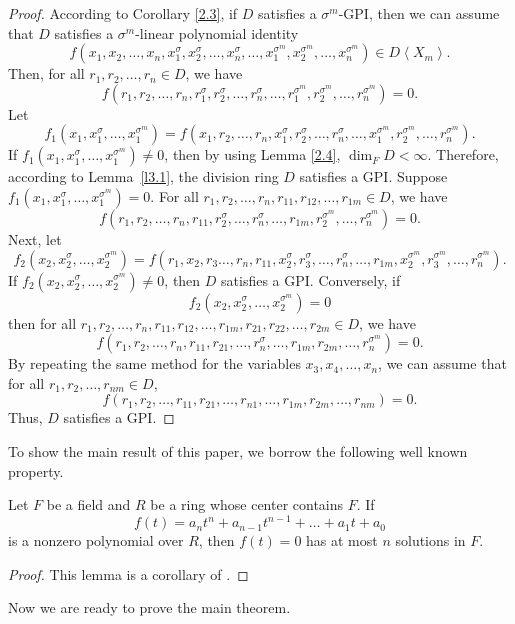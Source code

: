 \documentclass{cimart}
\begin{document}
\begin{proof} According to Corollary \ref{2.3}, if $D$ satisfies a $\sigma^m$-GPI, then we can assume that $D$ satisfies a $\sigma^m$-linear polynomial identity
	$$
	f(x_1, x_2, \dots, x_n, x_1^{\sigma}, x_2^{\sigma} ,\dots, x_n^{\sigma}, \dots,x_1^{\sigma^m}, x_2^{\sigma^m},\dots, x_n^{\sigma^m} )\in D\left\langle X_m \right\rangle .
	$$
	Then, for all $r_1, r_2, \dots, r_n\in D$, we have
	$$
	f(r_1, r_2, \dots, r_n, r_1^{\sigma}, r_2^{\sigma} ,\dots, r_n^{\sigma}, \dots,r_1^{\sigma^m}, r_2^{\sigma^m}, \dots, r_n^{\sigma^m} )=0.
	$$
	Let 
	$$
	f_1(x_1, x_1^{\sigma}, \dots, x_1^{\sigma^m} )=f(x_1, r_2, \dots, r_n, x_1^{\sigma}, r_2^{\sigma} ,\dots, r_n^{\sigma}, \dots,x_1^{\sigma^m}, r_2^{\sigma^m}, \dots, r_n^{\sigma^m} ).
	$$
	If $f_1(x_1, x_1^{\sigma}, \dots, x_1^{\sigma^m})\neq 0$, then by using Lemma \ref{2.4}, $\dim_FD<\infty$. Therefore, according to Lemma~\ref{l3.1}, the division ring $D$ satisfies a GPI. Suppose $f_1(x_1, x_1^{\sigma}, \dots, x_1^{\sigma^m})=0$. For all $r_1, r_2, \dots, r_n, r_{11}, r_{12}, \dots ,r_{1m}\in D$, we have
	$$
	f(r_1, r_2, \dots, r_n, r_{11}, r_2^{\sigma} ,\dots, r_n^{\sigma}, \dots,r_{1m}, r_2^{\sigma^m}, \dots, r_n^{\sigma^m} )=0.
	$$ 
	Next, let 
	$$
	f_2(x_2, x_2^{\sigma},\dots , x_2^{\sigma^m})	= f(r_1, x_2,r_3 \dots, r_n, r_{11}, x_2^{\sigma},r_3^{\sigma}  ,\dots, r_n^{\sigma}, \dots,r_{1m}, x_2^{\sigma^m}, r_3^{\sigma^m}, \dots, r_n^{\sigma^m}).
	$$
	If $f_2(x_2, x_2^{\sigma},\dots , x_2^{\sigma^m})\ne0$, then $D$ satisfies a GPI. Conversely, if
	$$
	f_2(x_2, x_2^{\sigma},\dots , x_2^{\sigma^m})=0
	$$
	then for all  $r_1, r_2, \dots, r_n, r_{11}, r_{12}, \dots ,r_{1m}, r_{21}, r_{22}, \dots , r_{2m}\in D$, we have 
	$$
	f(r_1, r_2, \dots, r_n, r_{11}, r_{21} ,\dots, r_n^{\sigma}, \dots,r_{1m}, r_{2m}, \dots, r_n^{\sigma^m} )=0.
	$$ 
	By repeating the same method for the variables $x_3, x_4, \dots, x_n$, we can assume that for all $r_1, r_2, \dots , r_{nm}\in D$, 
	$$
	f(r_1, r_2, \dots, r_{11}, r_{21}, \dots, r_{n1}, \dots, r_{1m}, r_{2m}, \dots , r_{nm} )=0.  
	$$
	Thus, $D$ satisfies a GPI.
\end{proof}

To show the main result of this paper, we borrow the following well known property.
\begin{lemma}\label{l3.3} Let $F$ be a field and $R$ be a ring whose center contains $F$. If 
\[
f(t)=a_nt^n+a_{n-1}t^{n-1}+\dots+a_1t+a_0
\]
is a nonzero polynomial over $R$, then $f(t)=0$ has at most $n$ solutions in $F$. 
\end{lemma}
\begin{proof} This lemma is a corollary of \cite[Proposition 2.3.27]{15}.
\end{proof}
Now we are ready to prove the main theorem.
\end{document}
